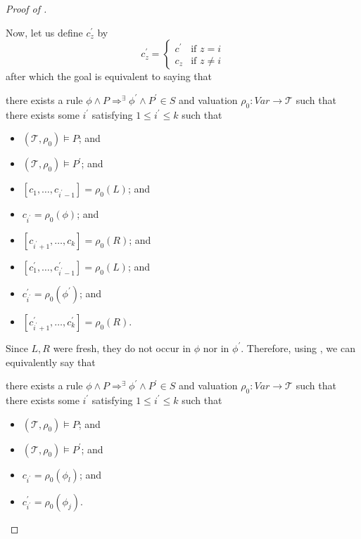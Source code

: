 \begin{proof}[Proof of ]
\begin{proofenv}
\end{proofenv}
Now, let us define $c^\prime_{z}$ by
\begin{equation*}
c^\prime_{z} =
    \begin{cases}
        c^\prime & \text{if } z = i \\
        c_z & \text{if } z \not = i
    \end{cases}
\end{equation*}
after which the goal is equivalent to saying that
\begin{proofenv}
there exists a rule $\phi \land P \Rightarrow^\exists \phi^\prime \land P^\prime \in S$
and valuation $\rho_0 : \mathit{Var} \to \mathcal{T}$ such that
there exists some $i^\prime$ satisfying $1 \leq i^\prime \leq k$ such that
\begin{itemize}
    \item $(\mathcal{T}, \rho_0) \vDash P$; and
    \item $(\mathcal{T}, \rho_0) \vDash P^\prime$; and
    \item $[c_1,\ldots, c_{i^\prime-1}] = \rho_0(L)$; and
    \item $c_{i^\prime} = \rho_0(\phi)$; and
    \item $[c_{i^\prime+1},\ldots,c_k] = \rho_0(R)$; and
    \item $[c^\prime_1,\ldots, c^\prime_{i^\prime-1}] = \rho_0(L)$; and
    \item $c^\prime_{i^\prime} = \rho_0(\phi^\prime)$; and
    \item $[c^\prime_{i^\prime+1},\ldots,c^\prime_k] = \rho_0(R)$.
\end{itemize}
\end{proofenv}
Since $L,R$ were fresh, they do not occur in $\phi$ nor in $\phi^\prime$.
Therefore, using , we can equivalently say that
\begin{proofenv}
there exists a rule $\phi \land P \Rightarrow^\exists \phi^\prime \land P^\prime \in S$
and valuation $\rho_0 : \mathit{Var} \to \mathcal{T}$ such that
there exists some $i^\prime$ satisfying $1 \leq i^\prime \leq k$
such that
\begin{itemize}
    \item $(\mathcal{T}, \rho_0) \vDash P$; and
    \item $(\mathcal{T}, \rho_0) \vDash P^\prime$; and
    \item $c_{i^\prime} = \rho_0(\phi_l)$; and
    \item $c^\prime_{i^\prime} = \rho_0(\phi_j)$.
\end{itemize}

\end{proofenv}
\end{proof}
